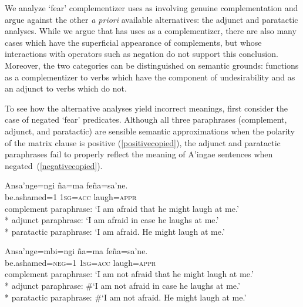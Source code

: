 \documentclass[output=paper,colorlinks,citecolor=brown]{langscibook}
\begin{document}
We analyze `fear' complementizer uses as involving genuine complementation and argue against the other \textit{a priori} available alternatives: the adjunct and paratactic analyses. %
While we argue that  has uses as a complementizer, there are also many cases which have the superficial appearance of complements, but whose interactions with operators such as negation do not support this conclusion. {Moreover, the two categories can be distinguished on semantic grounds:  functions as a complementizer to verbs which have the component of undesirability and as an adjunct to verbs which do not.}

To see how the alternative analyses yield incorrect meanings, first consider the case of negated `fear' predicates. Although all three paraphrases (complement, adjunct, and paratactic) are sensible semantic approximations when the polarity of the matrix clause is positive (\ref{positivecopied}), the adjunct and paratactic paraphrases fail to properly reflect the meaning of A'ingae sentences when negated~(\ref{negativecopied}).
\begin{exe}
    \ex \label{positivecopied}
    \gll Ansa'nge=ngi        {\ob}ña=ma       feña=sa'ne.{\cb} \\
         {be.ashamed=\textsc{1}} \textsc{1sg=acc} laugh=\textsc{appr} \\
    \glt complement paraphrase: `I am afraid that he might laugh at me.'\footnotemark\\*
         adjunct paraphrase: `I am afraid in case he laughs at me.' \\*    
         paratactic paraphrase: `I am afraid. He might laugh at me.'


    \ex \label{negativecopied}
    \gll Ansa'nge=mbi=ngi        {\ob}ña=ma       feña=sa'ne.{\cb} \\
         {be.ashamed=\textsc{neg=1}} \textsc{1sg=acc} laugh=\textsc{appr} \\
    \glt complement paraphrase: `I am not afraid that he might laugh at me.' \\*
         adjunct paraphrase: \#`I am not afraid in case he laughs at me.' \\*   
         paratactic paraphrase: \#`I am not afraid. He might laugh at me.' 
\end{exe}
\end{document}
